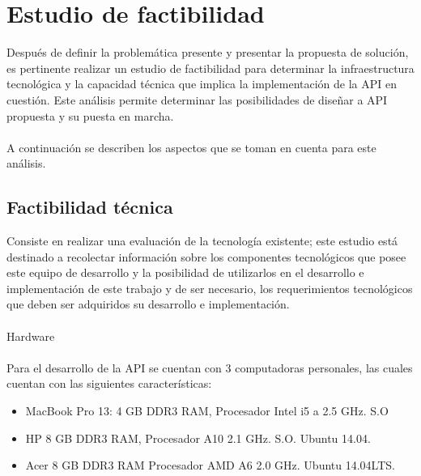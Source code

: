 	\section{Estudio de factibilidad}
Después de definir la problemática presente y presentar la propuesta de solución, es  pertinente realizar un estudio de factibilidad para determinar la infraestructura tecnológica y la capacidad técnica que implica la implementación de la API en cuestión. Este análisis permite determinar las posibilidades de diseñar a API propuesta y su puesta en marcha. 
\\\\
A continuación se describen los aspectos que se toman en cuenta para este análisis.
\subsection{Factibilidad técnica }
Consiste en realizar una evaluación de la tecnología existente; este estudio está destinado a recolectar información sobre los componentes tecnológicos que posee este equipo de desarrollo y la posibilidad de utilizarlos en el desarrollo e implementación de este trabajo y de ser necesario, los requerimientos tecnológicos que deben ser adquiridos su desarrollo e implementación. 
\\\\
Hardware 
\\\\
Para el desarrollo de la API se cuentan con 3 computadoras personales, las cuales cuentan 
con las siguientes características:
\begin{itemize}
 \item MacBook Pro 13: 4 GB DDR3 RAM, Procesador Intel i5 a 2.5 GHz. S.O
 \item HP 8 GB DDR3 RAM, Procesador A10 2.1 GHz. S.O. Ubuntu 14.04.
 \item Acer 8 GB DDR3 RAM Procesador AMD A6 2.0 GHz. Ubuntu 14.04LTS.
\end{itemize}


